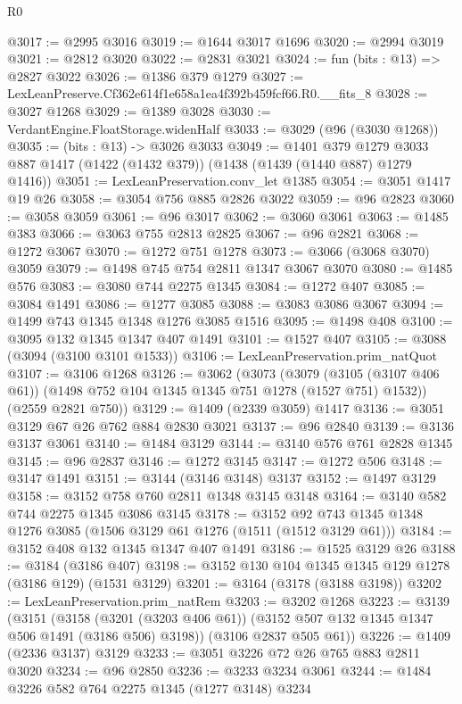 \begin{lexlean}{R0}
\begin{coremodule}
@3017 := @2995 @3016
@3019 := @1644 @3017 @1696
@3020 := @2994 @3019
@3021 := @2812 @3020
@3022 := @2831 @3021
@3024 := fun (bits : @13) => @2827 @3022
@3026 := @1386 @379 @1279
@3027 := LexLeanPreserve.Cf362e614f1e658a1ea4f392b459fcf66.R0.__fits_8
@3028 := @3027 @1268
@3029 := @1389 @3028
@3030 := VerdantEngine.FloatStorage.widenHalf
@3033 := @3029 (@96 (@3030 @1268))
@3035 := (bits : @13) -> @3026 @3033
@3049 := @1401
    @379
    @1279
    @3033
    @887
    @1417
    (@1422 (@1432 @379))
    (@1438 (@1439 (@1440 @887) @1279 @1416))
@3051 := LexLeanPreservation.conv_let @1385
@3054 := @3051 @1417 @19 @26
@3058 := @3054 @756 @885 @2826 @3022
@3059 := @96 @2823
@3060 := @3058 @3059
@3061 := @96 @3017
@3062 := @3060 @3061
@3063 := @1485 @383
@3066 := @3063 @755 @2813 @2825
@3067 := @96 @2821
@3068 := @1272 @3067
@3070 := @1272 @751 @1278
@3073 := @3066 (@3068 @3070) @3059
@3079 := @1498 @745 @754 @2811 @1347 @3067 @3070
@3080 := @1485 @576
@3083 := @3080 @744 @2275 @1345
@3084 := @1272 @407
@3085 := @3084 @1491
@3086 := @1277 @3085
@3088 := @3083 @3086 @3067
@3094 := @1499 @743 @1345 @1348 @1276 @3085 @1516
@3095 := @1498 @408
@3100 := @3095 @132 @1345 @1347 @407 @1491
@3101 := @1527 @407
@3105 := @3088 (@3094 (@3100 @3101 @1533))
@3106 := LexLeanPreservation.prim_natQuot
@3107 := @3106 @1268
@3126 := @3062
    (@3073
      (@3079 (@3105 (@3107 @406 @61)) (@1498 @752 @104 @1345 @1345 @751 @1278 (@1527 @751) @1532))
      (@2559 @2821 @750))
@3129 := @1409 (@2339 @3059) @1417
@3136 := @3051 @3129 @67 @26 @762 @884 @2830 @3021
@3137 := @96 @2840
@3139 := @3136 @3137 @3061
@3140 := @1484 @3129
@3144 := @3140 @576 @761 @2828 @1345
@3145 := @96 @2837
@3146 := @1272 @3145
@3147 := @1272 @506
@3148 := @3147 @1491
@3151 := @3144 (@3146 @3148) @3137
@3152 := @1497 @3129
@3158 := @3152 @758 @760 @2811 @1348 @3145 @3148
@3164 := @3140 @582 @744 @2275 @1345 @3086 @3145
@3178 := @3152 @92 @743 @1345 @1348 @1276 @3085 (@1506 @3129 @61 @1276 (@1511 (@1512 @3129 @61)))
@3184 := @3152 @408 @132 @1345 @1347 @407 @1491
@3186 := @1525 @3129 @26
@3188 := @3184 (@3186 @407)
@3198 := @3152 @130 @104 @1345 @1345 @129 @1278 (@3186 @129) (@1531 @3129)
@3201 := @3164 (@3178 (@3188 @3198))
@3202 := LexLeanPreservation.prim_natRem
@3203 := @3202 @1268
@3223 := @3139
    (@3151
      (@3158 (@3201 (@3203 @406 @61)) (@3152 @507 @132 @1345 @1347 @506 @1491 (@3186 @506) @3198))
      (@3106 @2837 @505 @61))
@3226 := @1409 (@2336 @3137) @3129
@3233 := @3051 @3226 @72 @26 @765 @883 @2811 @3020
@3234 := @96 @2850
@3236 := @3233 @3234 @3061
@3244 := @1484 @3226 @582 @764 @2275 @1345 (@1277 @3148) @3234

\end{coremodule}
\end{lexlean}
